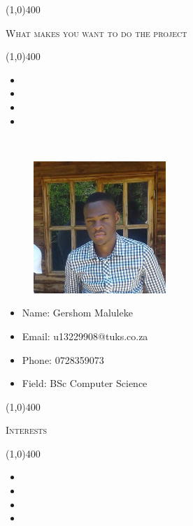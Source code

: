\documentclass[12pt,a4paper]{report}
\begin{document}
\begin{center}
	
	\line(1,0){400}\\
	{\scshape\large What makes you want to do the project\par}
	\line(1,0){400}\\
	\end{center}
		\begin{itemize}
\item 
\item 
\item 
\item 
\end{itemize}

\newpage
\vspace*{-3cm}\
\begin{minipage}{0.5\textwidth}
\begin{figure}[H]
\includegraphics[width=5cm,height=5cm,keepaspectratio]{u13229908.jpg}
\end{figure}
\end{minipage} \hfill
\begin{minipage}{0.6\textwidth}
\begin{itemize}
\item[] Name: Gershom Maluleke
\item[] Email: u13229908@tuks.co.za
\item[] Phone: 0728359073
\item[] Field: BSc Computer Science
\end{itemize}
\end{minipage}

\begin{center}
	
	\line(1,0){400}\\
	{\scshape\large Interests\par}
	\line(1,0){400}\\
	\end{center}
	\begin{itemize}
\item 
\item 
\item 
\item 
\end{itemize}
	
\end{document}
